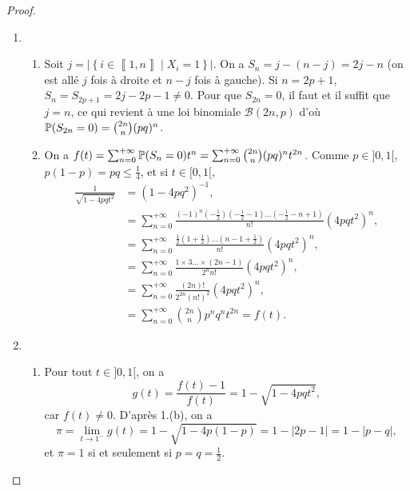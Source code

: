 \documentclass[12pt]{article}
\begin{document}
\begin{proof}
\begin{enumerate}
        \item 
        \begin{enumerate}
            \item Soit $j=\left\lvert\left\lbrace i\in\left\llbracket1,n\right\rrbracket\middle|X_i=1\right\rbrace\right\rvert$. On a $S_n=j-(n-j)=2j-n$ (on est allé $j$ fois à droite et $n-j$ fois à gauche). Si $n=2p+1$, $S_n=S_{2p+1}=2j-2p-1\neq0$. Pour que $S_{2n}=0$, il faut et il suffit que $j=n$, ce qui revient à une loi binomiale $\mathcal{B}(2n,p)$ d'où $\P(S_{2n}=0)=\binom{2n}{n}(pq)^{n}$.
            
            \item On a $f(t)=\sum_{n=0}^{+\infty}\P(S_n=0)t^{n}=\sum_{n=0}^{+\infty}\binom{2n}{n}(pq)^{n}t^{2n}$. Comme $p\in]0,1[$, $p(1-p)=pq\leqslant\frac{1}{4}$, et si $t\in[0,1[$, 
            \begin{align}
                \frac{1}{\sqrt{1-4pqt^{2}}}
                &=(1-4pq^{2})^{-1},\\
                &=\sum_{n=0}^{+\infty}\frac{(-1)^{n}\left(-\frac{1}{2}\right)\left(-\frac{1}{2}-1\right)\dots\left(-\frac{1}{2}-n+1\right)}{n!}(4pqt^{2})^{n},\\
                &=\sum_{n=0}^{+\infty}\frac{\frac{1}{2}\left(1+\frac{1}{2}\right)\dots\left(n-1+\frac{1}{2}\right)}{n!}(4pqt^{2})^{n},\\
                &=\sum_{n=0}^{+\infty}\frac{1\times 3\dots \times (2n-1)}{2^{n}n!}(4pqt^{2})^{n},\\
                &=\sum_{n=0}^{+\infty}\frac{(2n)!}{2^{2n}(n!)^{2}}(4pqt^{2})^{n},\\
                &=\sum_{n=0}^{+\infty}\binom{2n}{n}p^{n}q^{n}t^{2n}=f(t).
            \end{align}
        \end{enumerate}

        \item 
        \begin{enumerate}
            \item Pour tout $t\in]0,1[$, on a 
            \begin{equation}
                g(t)=\frac{f(t)-1}{f(t)}=1-\sqrt{1-4pqt^{2}},
            \end{equation}
            car $f(t)\neq0$. D'après 1.(b), on a 
            \begin{equation}
                \pi=\lim\limits_{t\to1^{-}}g(t)=1-\sqrt{1-4p(1-p)}=1-\left\lvert 2p-1\right\rvert=1-\left\lvert p-q\right\rvert,
            \end{equation}
            et $\pi=1$ si et seulement si $p=q=\frac{1}{2}$.


\end{enumerate}
\end{enumerate}
\end{proof}
\end{document}
